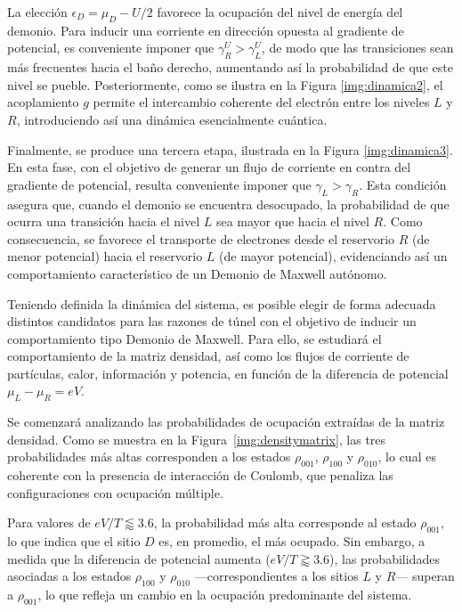 La elección $\epsilon_D = \mu_D - U/2$ favorece la ocupación del nivel de energía del demonio. Para inducir una corriente en dirección opuesta al gradiente de potencial, es conveniente imponer que $\gamma^{U}_{R} > \gamma^{U}_{L}$, de modo que las transiciones sean más frecuentes hacia el baño derecho, aumentando así la probabilidad de que este nivel se pueble. Posteriormente, como se ilustra en la Figura \ref{img:dinamica2}, el acoplamiento $g$ permite el intercambio coherente del electrón entre los niveles $L$ y $R$, introduciendo así una dinámica esencialmente cuántica.



Finalmente, se produce una tercera etapa, ilustrada en la Figura \ref{img:dinamica3}. En esta fase, con el objetivo de generar un flujo de corriente en contra del gradiente de potencial, resulta conveniente imponer que $\gamma_{L} > \gamma_{R}$. Esta condición asegura que, cuando el demonio se encuentra desocupado, la probabilidad de que ocurra una transición hacia el nivel $L$ sea mayor que hacia el nivel $R$. Como consecuencia, se favorece el transporte de electrones desde el reservorio $R$ (de menor potencial) hacia el reservorio $L$ (de mayor potencial), evidenciando así un comportamiento característico de un Demonio de Maxwell autónomo.



Teniendo definida la dinámica del sistema, es posible elegir de forma adecuada distintos candidatos para las razones de túnel con el objetivo de inducir un comportamiento tipo Demonio de Maxwell. Para ello, se estudiará el comportamiento de la matriz densidad, así como los flujos de corriente de partículas, calor, información y potencia, en función de la diferencia de potencial $\mu_{L} - \mu_{R} = eV$.

Se comenzará analizando las probabilidades de ocupación extraídas de la matriz densidad. Como se muestra en la Figura~\ref{img:densitymatrix}, las tres probabilidades más altas corresponden a los estados $\rho_{001}$, $\rho_{100}$ y $\rho_{010}$, lo cual es coherente con la presencia de interacción de Coulomb, que penaliza las configuraciones con ocupación múltiple.

Para valores de $eV/T \lessapprox 3.6$, la probabilidad más alta corresponde al estado $\rho_{001}$, lo que indica que el sitio $D$ es, en promedio, el más ocupado. Sin embargo, a medida que la diferencia de potencial aumenta ($eV/T \gtrapprox 3.6$), las probabilidades asociadas a los estados $\rho_{100}$ y $\rho_{010}$ —correspondientes a los sitios $L$ y $R$— superan a $\rho_{001}$, lo que refleja un cambio en la ocupación predominante del sistema.

